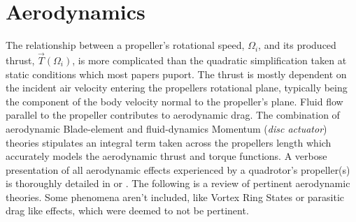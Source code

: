\section{Aerodynamics}
\label{sec:dynamics.aero}
The relationship between a propeller's rotational speed, $\Omega_i$, and its produced thrust, $\vec{T}(\Omega_i)$, is more complicated than the quadratic simplification taken at static conditions which most papers puport. The thrust is mostly dependent on the incident air velocity entering the propellers rotational plane, typically being the component of the body velocity normal to the propeller's plane. Fluid flow parallel to the propeller contributes to aerodynamic drag. The combination of aerodynamic Blade-element\cite{bem,forwarddescent} and fluid-dynamics Momentum (\emph{disc actuator}) theories stipulates an integral term taken across the propellers length which accurately models the aerodynamic thrust and torque functions. A verbose presentation of all aerodynamic effects experienced by a quadrotor's propeller(s) is thoroughly detailed in \cite{bladesforquadrotors} or \cite{nonlineardynamics}. The following is a review of pertinent aerodynamic theories. Some phenomena aren't included, like Vortex Ring States or parasitic drag like effects, which were deemed to not be pertinent.
